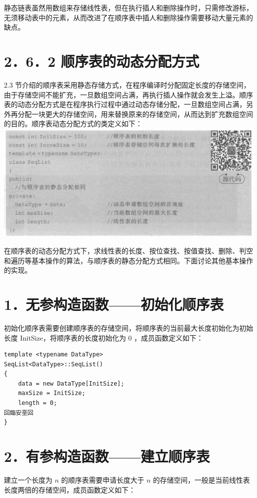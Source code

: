 \documentclass[10pt]{article}
\begin{document}
静态链表虽然用数组来存储线性表，但在执行插人和删除操作时，只需修改游标，无须移动表中的元素，从而改进了在顺序表中插人和删除操作需要移动大量元素的缺点。

\section*{2．6．2 顺序表的动态分配方式}
2.3 节介绍的顺序表采用静态存储方式，在程序编译时分配固定长度的存储空间，由于存储空间不能扩充，一旦数组空间占满，再执行插人操作就会发生上溢。顺序表的动态分配方式是在程序执行过程中通过动态存储分配，一旦数组空间占满，另外再分配一块更大的存储空间，用来替换原来的存储空间，从而达到扩充数组空间的目的。顺序表动态分配方式的类定义如下：\\
\includegraphics[max width=\textwidth, center]{2025_06_06_704745ea57b15b2333e5g-068}

在顺序表的动态分配方式下，求线性表的长度、按位查找、按值查找、删除、判空和遍历等基本操作的算法，与顺序表的静态分配方式相同。下面讨论其他基本操作的实现。

\section*{1．无参构造函数——初始化顺序表}
初始化顺序表需要创建顺序表的存储空间，将顺序表的当前最大长度初始化为初始长度 InitSize，将顺序表的长度初始化为 0 ，成员函数定义如下：

\begin{verbatim}
template <typename DataType>
SeqList<DataType>::SeqList()
{
    data = new DataType[InitSize];
    maxSize = InitSize;
    length = 0;
回臨安垩回
}
\end{verbatim}

\section*{2．有参构造函数——建立顺序表}
建立一个长度为 $n$ 的顺序表需要申请长度大于 $n$ 的存储空间，一般是当前线性表长度两倍的存储空间，成员函数定义如下：
\end{document}

